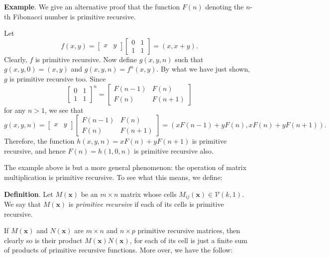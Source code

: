 \documentclass[12pt]{article}
\begin{document}
\textbf{Example}.  We give an alternative proof that the function $F(n)$ denoting the $n$-th Fibonacci number is primitive recursive.

Let $$f(x,y)=\begin{bmatrix}x & y \end{bmatrix}\begin{bmatrix}
    0 & 1 \\
    1 & 1 
  \end{bmatrix} = (x,x+y).$$
Clearly, $f$ is primitive recursive.  Now define $g(x,y,n)$ such that $g(x,y,0)=(x,y)$ and $g(x,y,n)=f^n(x,y)$.  By what we have just shown, $g$ is primitive recursive too.  Since $$\begin{bmatrix}
    0 & 1 \\
    1 & 1 
  \end{bmatrix}^n = \begin{bmatrix}
    F(n-1) & F(n) \\
    F(n) & F(n+1)
  \end{bmatrix}$$
for any $n > 1$, we see that $$g(x,y,n)=\begin{bmatrix}x & y \end{bmatrix}\begin{bmatrix}
    F(n-1) & F(n) \\
    F(n) & F(n+1) 
  \end{bmatrix} = (xF(n-1)+yF(n),xF(n)+yF(n+1)).$$
Therefore, the function $h(x,y,n)=xF(n)+yF(n+1)$ is primitive recursive, and hence $F(n)= h(1,0,n)$ is primitive recursive also.

The example above is but a more general phenomenon: the operation of matrix multiplication is primitive recursive.  To see what this means, we define:

\textbf{Definition}.  Let $M(\boldsymbol{x})$ be an $m\times n$ matrix whose cells $M_{ij}(\boldsymbol{x})\in \mathcal{V}(k,1)$.  We say that $M(\boldsymbol{x})$ is \emph{primitive recursive} if each of its cells is primitive recursive.

If $M(\boldsymbol{x})$ and $N(\boldsymbol{x})$ are $m\times n$ and $n\times p$ primitive recursive matrices, then clearly so is their product $M(\boldsymbol{x}) N(\boldsymbol{x})$, for each of its cell is just a finite sum of products of primitive recursive functions.  More over, we have the follow:
\end{document}
